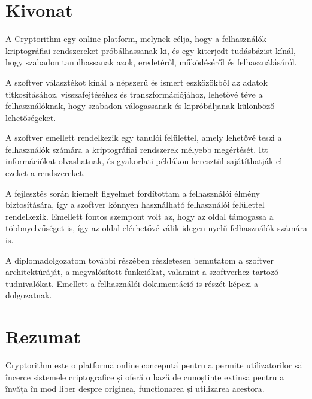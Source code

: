
\hungarianParagraph


\chapter*{Kivonat}

A Cryptorithm egy online platform, melynek célja, hogy a felhasználók kriptográfiai rendszereket próbálhassanak ki, és egy kiterjedt tudásbázist kínál, hogy szabadon tanulhassanak azok, eredetéről, működéséről és felhasználásáról.

A szoftver választékot kínál a népszerű és ismert eszközökből az adatok titkosításához, visszafejtéséhez és transzformációjához, lehetővé téve a felhasználóknak, hogy szabadon válogassanak és kipróbáljanak különböző lehetőségeket.

A szoftver emellett rendelkezik egy tanulói felülettel, amely lehetővé teszi a felhasználók számára a kriptográfiai rendszerek mélyebb megértését. Itt információkat olvashatnak, és gyakorlati példákon keresztül sajátíthatják el ezeket a rendszereket. 

A fejlesztés során kiemelt figyelmet fordítottam a felhasználói élmény biztosítására, így a szoftver könnyen használható felhasználói felülettel rendelkezik. Emellett fontos szempont volt az, hogy az oldal támogassa a többnyelvűséget is, így az oldal elérhetővé válik idegen nyelű felhasználók számára is.

A diplomadolgozatom további részében részletesen bemutatom a szoftver architektúráját, a megvalósított funkciókat, valamint a szoftverhez tartozó tudnivalókat. Emellett a felhasználói dokumentáció is részét képezi a dolgozatnak.


\vfill
{}

\chapter*{Rezumat}

Cryptorithm este o platformă online concepută pentru a permite utilizatorilor să încerce sistemele criptografice și oferă o bază de cunoștințe extinsă pentru a învăța în mod liber despre originea, funcționarea și utilizarea acestora.


